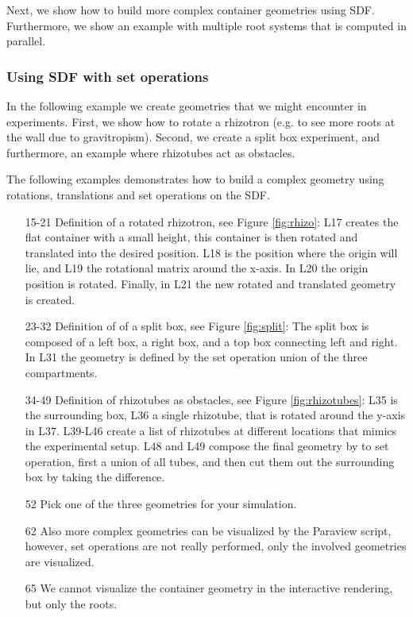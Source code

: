 Next, we show how to build more complex container geometries using SDF. 
Furthermore, we show an example with multiple root systems that is computed in parallel.

\subsubsection*{Using SDF with set operations}

In the following example we create geometries that we might encounter in experiments. 
First, we show how to rotate a rhizotron (e.g. to see more roots at the wall due to gravitropism). 
Second, we create a split box experiment, and furthermore, an example where rhizotubes act as obstacles.

The following examples demonstrates how to build a complex geometry using rotations, translations and set operations on the SDF.



\begin{itemize}

\item[15-21] Definition of a rotated rhizotron, see Figure \ref{fig:rhizo}: 
L17 creates the flat container with a small height, this container is then rotated and translated into the desired position. 
L18 is the position where the origin will lie, and L19 the rotational matrix around the x-axis. 
In L20 the origin position is rotated. Finally, in L21 the new rotated and translated geometry is created. 
\item[23-32] Definition of of a split box, see Figure \ref{fig:split}: 
The split box is composed of a left box, a right box, and a top box connecting left and right. 
In L31 the geometry is defined by the set operation union of the three compartments. 
\item[34-49] Definition of rhizotubes as obstacles, see Figure \ref{fig:rhizotubes}: L35 is the surrounding box, 
L36 a single rhizotube, that is rotated around the y-axis in L37. 
L39-L46 create a list of rhizotubes at different locations that mimics the experimental setup. 
L48 and L49 compose the final geometry by to set operation, first a union of all tubes, 
and then cut them out the surrounding box by taking the difference. 
\item[52] Pick one of the three geometries for your simulation.
\item[62] Also more complex geometries can be visualized by the Paraview script, 
however, set operations are not really performed, only the involved geometries are visualized.
\item[65] We cannot visualize the container geometry in the interactive rendering, but only the roots. 

\end{itemize}

